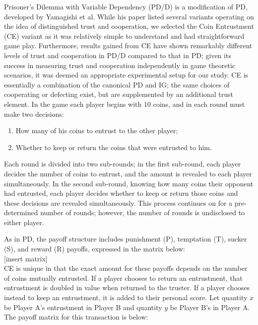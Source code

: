 \documentclass{sig-alternate}
\begin{document}
Prisoner's Dilemma with Variable Dependency (PD/D) is a modification of PD, developed by Yamagishi et al. While his paper listed several variants operating on the idea of distinguished trust and cooperation, we selected the Coin Entrustment (CE) variant as it was relatively simple to understand and had straightforward game play. Furthermore, results gained from CE have shown remarkably different levels of trust and cooperation in PD/D compared to that in PD; given its success in measuring trust and cooperation independently in game theoretic scenarios, it was deemed an appropriate experimental setup for our study. CE is essentially a combination of the canonical PD and IG; the same choices of cooperating or defecting exist, but are supplemented by an additional trust element. In the game each player begins with 10 coins, and in each round must make two decisions:

\begin{enumerate}
\item How many of his coins to entrust to the other player;
\item Whether to keep or return the coins that were entrusted to him.
\end{enumerate}

Each round is divided into two sub-rounds; in the first sub-round, each player decides the number of coins to entrust, and the amount is revealed to each player simultaneously. In the second sub-round, knowing how many coins their opponent had entrusted, each player decides whether to keep or return those coins and these decisions are revealed simultaneously. This process continues on for a pre-determined number of rounds; however, the number of rounds is undisclosed to either player. 

As in PD, the payoff structure includes punishment (P), temptation (T), sucker (S), and reward (R) payoffs, expressed in the matrix below: \\

[insert matrix]\\

CE is unique in that the exact amount for these payoffs depends on the number of coins mutually entrusted. If a player chooses to return an entrustment, that entrustment is doubled in value when returned to the truster. If a player chooses instead to keep an entrustment, it is added to their personal score. Let quantity $x$ be Player A's entrustment in Player B and quantity $y$ be Player B's in Player A. The payoff matrix for this transaction is below:\\
\end{document}
